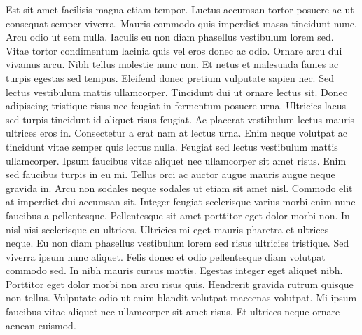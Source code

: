 \documentclass[11pt]{article}
\begin{document}
\par Est sit amet facilisis magna etiam tempor. Luctus accumsan tortor posuere ac ut consequat semper viverra. Mauris commodo quis imperdiet massa tincidunt nunc. Arcu odio ut sem nulla. Iaculis eu non diam phasellus vestibulum lorem sed. Vitae tortor condimentum lacinia quis vel eros donec ac odio. Ornare arcu dui vivamus arcu. Nibh tellus molestie nunc non. Et netus et malesuada fames ac turpis egestas sed tempus. Eleifend donec pretium vulputate sapien nec. Sed lectus vestibulum mattis ullamcorper. Tincidunt dui ut ornare lectus sit. Donec adipiscing tristique risus nec feugiat in fermentum posuere urna. Ultricies lacus sed turpis tincidunt id aliquet risus feugiat. Ac placerat vestibulum lectus mauris ultrices eros in. Consectetur a erat nam at lectus urna. Enim neque volutpat ac tincidunt vitae semper quis lectus nulla. Feugiat sed lectus vestibulum mattis ullamcorper. Ipsum faucibus vitae aliquet nec ullamcorper sit amet risus. Enim sed faucibus turpis in eu mi. Tellus orci ac auctor augue mauris augue neque gravida in. Arcu non sodales neque sodales ut etiam sit amet nisl. Commodo elit at imperdiet dui accumsan sit. Integer feugiat scelerisque varius morbi enim nunc faucibus a pellentesque. Pellentesque sit amet porttitor eget dolor morbi non. In nisl nisi scelerisque eu ultrices. Ultricies mi eget mauris pharetra et ultrices neque. Eu non diam phasellus vestibulum lorem sed risus ultricies tristique. Sed viverra ipsum nunc aliquet. Felis donec et odio pellentesque diam volutpat commodo sed. In nibh mauris cursus mattis. Egestas integer eget aliquet nibh. Porttitor eget dolor morbi non arcu risus quis. Hendrerit gravida rutrum quisque non tellus. Vulputate odio ut enim blandit volutpat maecenas volutpat. Mi ipsum faucibus vitae aliquet nec ullamcorper sit amet risus. Et ultrices neque ornare aenean euismod.
\end{document}
